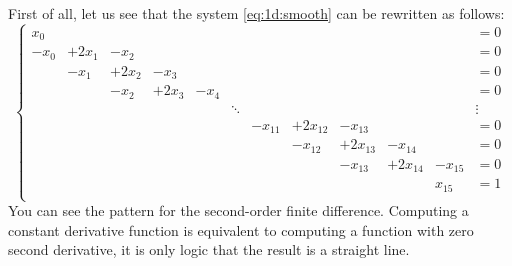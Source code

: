 \documentclass[notitlepage,oneside]{book}
\begin{document}
First of all, let us see that the system \eqref{eq:1d:smooth} can be rewritten as follows:
\begin{equation}
\label{eq:1d:smooth-laplacian}
\left\{
\begin{array}{cccccccccccl}
 x_0 &       &       &       &      &        &         &          &          &          &         &= 0 \\
-x_0 & +2x_1 & -x_2  &       &      &        &         &          &          &          &         &= 0 \\
     & -x_1  & +2x_2 & -x_3  &      &        &         &          &          &          &         &= 0 \\
     &       & -x_2  & +2x_3 & -x_4 &        &         &          &          &          &         &= 0 \\
     &       &       &       &      & \ddots &         &          &          &          &         &  \vdots \\
     &       &       &       &      &        & -x_{11} & +2x_{12} & -x_{13}  &          &         &= 0 \\
     &       &       &       &      &        &         & -x_{12}  & +2x_{13} & -x_{14}  &         &= 0 \\
     &       &       &       &      &        &         &          & -x_{13}  & +2x_{14} & -x_{15} &= 0 \\
     &       &       &       &      &        &         &          &          &          &  x_{15} &= 1 \\
\end{array}
\right.
\end{equation}
You can see the pattern for the second-order finite difference.
Computing a constant derivative function is equivalent to computing a function with zero second derivative, it is only logic that the result is a straight line.
\end{document}
